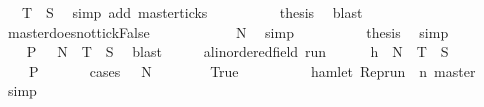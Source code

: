 \begin{isabellebody}
\ {\isacartoucheopen}{\isasymrho}\ {\isasymin}\ {\isacharquery}T\ {\isasyminter}\ {\isacharquery}S{\isacartoucheclose}\ \isamarkupfalse%
\ {\isacharparenleft}simp\ add{\isacharcolon}\ master{\isacharunderscore}ticks{\isacharparenright}\isanewline
\ \ \ \ \ \ \ \ \isamarkupfalse%
\ {\isacharquery}thesis\ \isamarkupfalse%
\ blast\isanewline
\ \ \ \ \isamarkupfalse%
\isanewline
\ \ \ \ \ \ \isamarkupfalse%
\ master{\isacharunderscore}doesnot{\isacharunderscore}tick{\isacharcolon}False\isanewline
\ \ \ \ \ \ \ \ \isamarkupfalse%
\ {\isacartoucheopen}{\isasymrho}\ {\isasymin}\ {\isacharquery}N{\isacartoucheclose}\ \isamarkupfalse%
\ simp\isanewline
\ \ \ \ \ \ \ \ \isamarkupfalse%
\ {\isacharquery}thesis\ \isamarkupfalse%
\ simp\isanewline
\ \ \ \ \isamarkupfalse%
\isanewline
\ \ \isacommand{{\isacharbraceright}}\isamarkupfalse%
\ \isamarkupfalse%
\ {\isacartoucheopen}{\isacharbraceleft}{\isasymrho}{\isachardot}\ {\isacharquery}P\ {\isasymrho}{\isacharbraceright}\ {\isasymsubseteq}\ {\isacharquery}N\ {\isasymunion}\ {\isacharquery}T\ {\isasyminter}\ {\isacharquery}S{\isacartoucheclose}\ \isamarkupfalse%
\ blast\isanewline
\ \ \isacommand{{\isacharbraceleft}}\isamarkupfalse%
\ \isamarkupfalse%
\ {\isasymrho}{\isacharcolon}{\isacharcolon}{\isacartoucheopen}{\isacharparenleft}{\isacharprime}a{\isacharcolon}{\isacharcolon}linordered{\isacharunderscore}field{\isacharparenright}\ run{\isacartoucheclose}\isanewline
\ \ \ \ \isamarkupfalse%
\ h{\isacharcolon}{\isacartoucheopen}{\isasymrho}\ {\isasymin}\ {\isacharquery}N\ {\isasymunion}\ {\isacharquery}T\ {\isasyminter}\ {\isacharquery}S{\isacartoucheclose}\isanewline
\ \ \ \ \isamarkupfalse%
\ {\isacartoucheopen}{\isasymrho}\ {\isasymin}\ {\isacharbraceleft}{\isasymrho}{\isachardot}\ {\isacharquery}P\ {\isasymrho}{\isacharbraceright}{\isacartoucheclose}\isanewline
\ \ \ \ \isamarkupfalse%
\ {\isacharparenleft}cases\ {\isacartoucheopen}{\isasymrho}\ {\isasymin}\ {\isacharquery}N{\isacartoucheclose}{\isacharparenright}\isanewline
\ \ \ \ \ \ \isamarkupfalse%
\ True\isanewline
\ \ \ \ \ \ \ \ \isamarkupfalse%
\ {\isacartoucheopen}{\isasymnot}hamlet\ {\isacharparenleft}Rep{\isacharunderscore}run\ {\isasymrho}\ n\ master{\isacharparenright}{\isacartoucheclose}\ \isamarkupfalse%
\ simp\isanewline
\ \ \ \ \ \ \ \ \isamarkupfalse%

\end{isabellebody}
